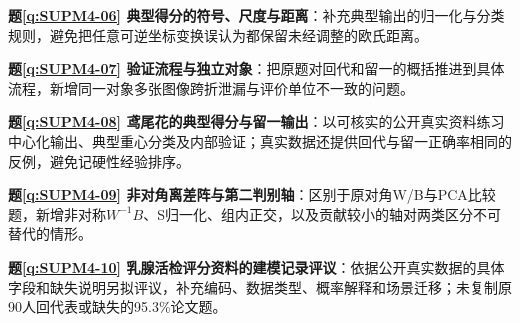 \noindent\textbf{题\ref*{q:SUPM4-06} 典型得分的符号、尺度与距离}：补充典型输出的归一化与分类规则，避免把任意可逆坐标变换误认为都保留未经调整的欧氏距离。\par

\noindent\textbf{题\ref*{q:SUPM4-07} 验证流程与独立对象}：把原题对回代和留一的概括推进到具体流程，新增同一对象多张图像跨折泄漏与评价单位不一致的问题。\par

\noindent\textbf{题\ref*{q:SUPM4-08} 鸢尾花的典型得分与留一输出}：以可核实的公开真实资料练习中心化输出、典型重心分类及内部验证；真实数据还提供回代与留一正确率相同的反例，避免记硬性经验排序。\par

\noindent\textbf{题\ref*{q:SUPM4-09} 非对角离差阵与第二判别轴}：区别于原对角W/B与PCA比较题，新增非对称$W^{-1}B$、S归一化、组内正交，以及贡献较小的轴对两类区分不可替代的情形。\par

\noindent\textbf{题\ref*{q:SUPM4-10} 乳腺活检评分资料的建模记录评议}：依据公开真实数据的具体字段和缺失说明另拟评议，补充编码、数据类型、概率解释和场景迁移；未复制原90人回代表或缺失的95.3\%论文题。\par

\endgroup

